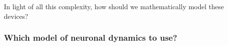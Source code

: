 \documentclass[twocolumn]{article}
\begin{document}
\newpage
\appendix

In light of all this complexity, how should we mathematically model these devices?

\subsubsection{Which model of neuronal dynamics to use?}





\end{document}
